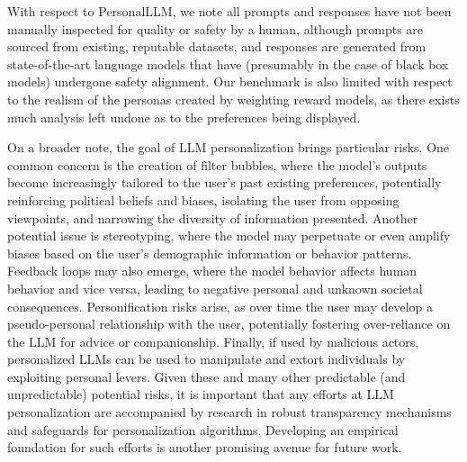With respect to \textsf{PersonalLLM}, we note all prompts and responses have not been manually inspected for quality or safety by a human, although prompts are sourced from existing, reputable datasets, and responses are generated from state-of-the-art language models that have (presumably in the case of black box models) undergone safety alignment.
Our benchmark is also limited with respect to the realism of the personas created by weighting reward models, as there exists much analysis left undone as to the preferences being displayed.

On a broader note, the goal of LLM personalization brings particular risks.
One common concern is the creation of filter bubbles, where the model's outputs become increasingly tailored to the user's past existing preferences, potentially reinforcing political beliefs and biases, isolating the user from opposing viewpoints, and narrowing the diversity of information presented.
Another potential issue is stereotyping, where the model may perpetuate or even amplify biases based on the user's demographic information or behavior patterns.
Feedback loops may also emerge, where the model behavior affects human behavior and vice versa, leading to negative personal and unknown societal consequences.
Personification risks arise, as over time the user may develop a pseudo-personal relationship with the user, potentially fostering over-reliance on the LLM for advice or companionship. Finally, 
if used by malicious actors, personalized
LLMs can be used to manipulate and extort
individuals by exploiting personal levers.
Given these and many other predictable (and unpredictable) potential risks, it is important that any efforts at LLM personalization are accompanied by research in robust transparency mechanisms and safeguards for personalization algorithms. Developing an empirical foundation for such efforts is another promising avenue for future work.

